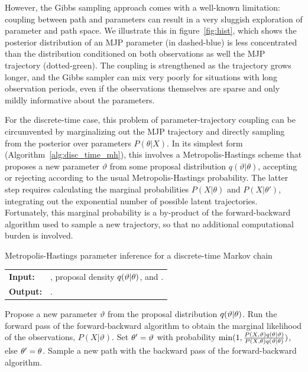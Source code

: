   However, the Gibbs sampling approach %
  comes with a well-known limitation:
coupling between path and parameters can result in a very sluggish
exploration of parameter and path space. We illustrate this in figure~\ref{fig:hist},
which shows the posterior distribution of an MJP parameter (in dashed-blue)
is less concentrated than the distribution conditioned on both observations 
as well the MJP trajectory (dotted-green). 
The coupling is strengthened as the trajectory grows longer, and
the Gibbs sampler can mix very poorly for situations with
long observation periods, even if the observations themselves are
sparse and only mildly informative about the parameters.

For the discrete-time case, this problem of parameter-trajectory
coupling can be circumvented by marginalizing out the MJP trajectory 
and directly sampling from the posterior over parameters $P(\theta|X)$.
In its simplest form (Algorithm~\ref{alg:disc_time_mh}), this 
involves a Metropolis-Hastings scheme that proposes a new parameter 
$\vartheta$ from some proposal distribution 
$q(\vartheta|\theta)$, accepting or rejecting according to the usual
Metropolis-Hastings probability. The latter step requires calculating the 
marginal probabilities $P(X|\theta)$ and $P(X|\theta')$, integrating out
the exponential number of possible latent trajectories. Fortunately,
this marginal probability is a by-product of the forward-backward
algorithm used to sample a new trajectory, so that no 
additional computational burden is involved. 
\begin{algorithm}[H]
  \caption{Metropolis-Hastings parameter inference for a discrete-time 
Markov chain}
   \label{alg:disc_time_mh}
  \begin{tabular}{l l}
   \textbf{Input:  } & \text{Observations $X$},
   proposal density $q(\vartheta|\theta)$, and 
   \text{previous parameters $\ctheta$}.\\
   \textbf{Output:  }& \text{A new Markov chain parameter $\ntheta$}.\\
   \hline
   \end{tabular}
   \begin{algorithmic}[1]
  \State Propose a new parameter $\vartheta$ from the proposal distribution
  $q(\vartheta|\theta)$.
  \State Run the forward pass of the forward-backward algorithm to 
    obtain the marginal likelihood of the observations, $P(X|\vartheta)$.
    \State Set $\theta' = \vartheta$ with probability 
    $\min(1,\frac{P(X,\vartheta)q(\theta|\vartheta)}{P(X,\theta)q(\vartheta|\theta)})$, else 
    $\theta' = \theta$.
  \State Sample a new path with
    the backward pass of the forward-backward algorithm.
\end{algorithmic}
\end{algorithm}

